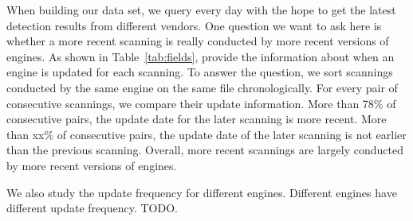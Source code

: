 When building our data set, 
we query \vt{} every day with the 
hope to get the latest detection results from different vendors. 
One question we want to ask here is whether a more recent scanning 
is really conducted by more recent versions of engines. 
As shown in Table~\ref{tab:fields},
\vt{} provide the information about when 
an engine is updated for each scanning.  
To answer the question, we sort scannings conducted by the same engine 
on the same file chronologically.
For every pair of consecutive scannings, we compare their update information. 
More than 78\% of consecutive pairs, the update date for the later scanning is more recent.
More than {\color{red} xx\%} of consecutive pairs, the update date of the later 
scanning is not earlier than the previous scanning. 
Overall, more recent scannings are largely conducted
by more recent versions of engines. 

We also study the update frequency for different engines. 
Different engines have different update frequency. 
{\color{red} TODO}. 

